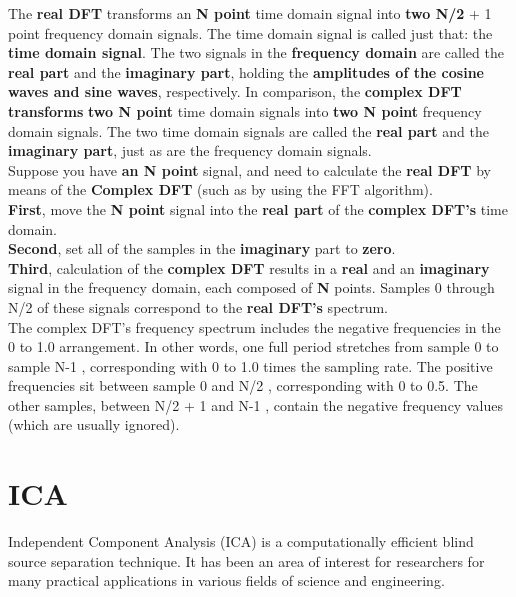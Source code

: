 \begin{compactitem}
The \textbf{real DFT} transforms an \textbf{N point} time domain signal into
\textbf{two N/2} + 1 point frequency domain signals. The time domain
signal is called just that: the \textbf{time domain signal}. The two signals in the
\textbf{frequency domain} are called the \textbf{real part} and the \textbf{imaginary part},
holding the \textbf{amplitudes of the cosine waves and sine waves}, respectively.
In comparison, the \textbf{complex DFT transforms} \textbf{two N point} time domain signals
into \textbf{two N point} frequency domain signals. The two time domain signals are
called the \textbf{real part} and the \textbf{imaginary part}, just as are the frequency domain
signals.
\\Suppose you have \textbf{an N point} signal, and need to calculate the \textbf{real DFT} by
means of the \textbf{Complex DFT} (such as by using the FFT algorithm).\\
\textbf{First}, move the \textbf{N point} signal into the \textbf{real part} of the \textbf{complex DFT's} time domain.\\
\textbf{Second}, set all of the samples in the \textbf{imaginary} part to \textbf{zero}.\\
\textbf{Third}, calculation of the \textbf{complex DFT} results in a \textbf{real} and an \textbf{imaginary} 
signal in the frequency domain, each composed of \textbf{N} points.
Samples 0 through N/2 of these signals correspond to the \textbf{real DFT's} spectrum.\\
The complex DFT's frequency spectrum includes the negative frequencies in the 0
to 1.0 arrangement. In other words, one full period stretches from sample 0 to
sample N-1 , corresponding with 0 to 1.0 times the sampling rate. The positive
frequencies sit between sample 0 and N/2 , corresponding with 0 to 0.5. The
other samples, between N/2 + 1 and N-1 , contain the negative frequency
values (which are usually ignored). \cite{smith1997dspbook}


\end{compactitem}


\section{ICA}
Independent Component Analysis (ICA) is a computationally efficient blind source separation technique.
It has been an area of interest for researchers for many practical applications in various fields of science and
engineering.

